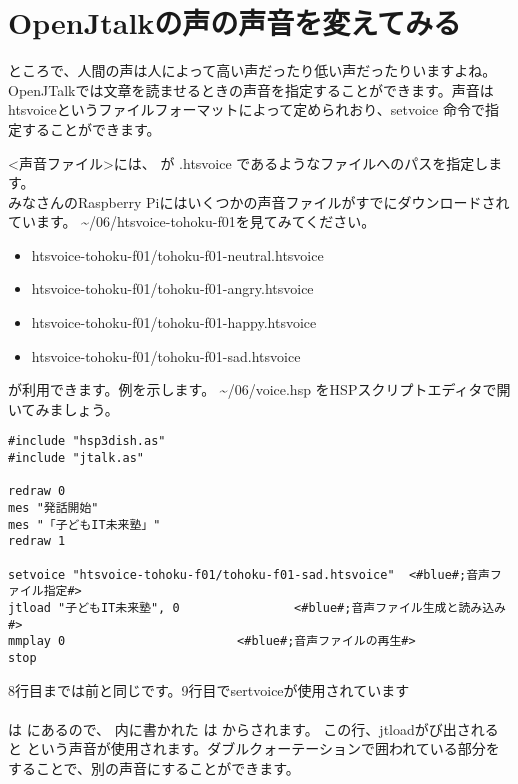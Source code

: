 \newpage
\section{OpenJtalkの声の声音を変えてみる}
ところで、人間の声は人によって高い声だったり低い声だったりいますよね。OpenJTalkでは文章を読ませるときの声音を指定することができます。声音はhtsvoiceというファイルフォーマットによって定められおり、setvoice 命令で指定することができます。\\

<声音ファイル>には、 が .htsvoice であるようなファイルへのパスを指定します。\\
みなさんのRaspberry Piにはいくつかの声音ファイルがすでにダウンロードされています。  \textasciitilde /06/htsvoice-tohoku-f01を見てみてください。

\begin{itemize}
\item htsvoice-tohoku-f01/tohoku-f01-neutral.htsvoice
\item htsvoice-tohoku-f01/tohoku-f01-angry.htsvoice
\item htsvoice-tohoku-f01/tohoku-f01-happy.htsvoice
\item htsvoice-tohoku-f01/tohoku-f01-sad.htsvoice
\end{itemize}

が利用できます。例を示します。 \textasciitilde /06/voice.hsp をHSPスクリプトエディタで開いてみましょう。\\

\begin{lstlisting}[caption=voice.hsp,label=voice.hsp]
#include "hsp3dish.as"
#include "jtalk.as"

redraw 0
mes "発話開始"
mes "「子どもIT未来塾」"
redraw 1

setvoice "htsvoice-tohoku-f01/tohoku-f01-sad.htsvoice"	<#blue#;音声ファイル指定#>
jtload "子どもIT未来塾", 0				<#blue#;音声ファイル生成と読み込み#>
mmplay 0						<#blue#;音声ファイルの再生#>
stop
\end{lstlisting}

8行目までは前と同じです。9行目でsertvoiceが使用されています\\
\\
 は  にあるので、
 内に書かれた 
は  からされます。
この行、jtloadがび出されると 
という声音が使用されます。ダブルクォーテーションで囲われている部分をすることで、別の声音にすることができます。\\

\begin{tcolorbox}[title=\useOmetoi]
\begin{enumerate}
\end{enumerate}
\end{tcolorbox}
